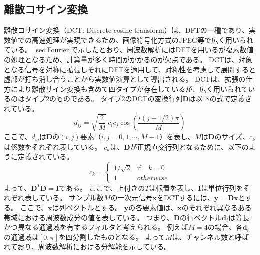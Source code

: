 \documentclass[11pt,a4paper]{jsarticle}
\begin{document}
\subsection{離散コサイン変換}\label{sec:DCT}
離散コサイン変換（DCT: Discrete cosine transform）は、DFTの一種であり、実数値での高速処理が実現できるため、画像符号化方式のJPEG等で広く用いられている。
\ref{sec:Fourier}で示したとおり、周波数解析にはDFTを用いるが複素数値の処理となるため、計算量が多く時間がかかるのが欠点である。
DCTは、対象となる信号を対称に拡張しそれにDFTを適用して、対称性を考慮して展開すると虚部が打ち消し合うことから実数値演算として導出される。
DCTは、拡張の仕方により離散サイン変換も含めて四タイプが存在しているが、広く用いられているのはタイプ$2$のものである。
タイプ$2$のDCTの変換行列$\mathbf{D}$は以下の式で定義されている。
\begin{equation}
	d_{ij}=\sqrt{\frac{2}{M}}\ 
	c_ic_j\cos\left(
	\frac{i(j+1/2)\pi}{M}
	\right)
	\label{eq:DCT}
\end{equation}
ここで、$d_{ij}$は$\mathbf{D}$の$(i,j)$要素（$i,j=0,1,\cdots,M-1$）を表し、$M$は$\mathbf{D}$のサイズ、$c_k$は係数をそれぞれ表している。
$c_k$は、$\mathbf{D}$が正規直交行列となるために、以下のように定義されている。
\begin{equation*}
	c_k=\left\{
	\begin{array}{ll}
		1/\sqrt{2}&\mathrm{if}\quad k=0\\
		1&otherwise
	\end{array}
	\right.
\end{equation*}
よって、${\mathbf D}^{T}\mathbf{D}=\mathbf{I}$である。
ここで、上付きの$T$は転置を表し、$\mathbf{I}$は単位行列をそれぞれ表している。
サンプル数$M$の一次元信号$\bm{x}$をDCTするには、$\bm{y}=\mathbf{D}\bm{x}$とする。
ここで、$\bm{x}$は列ベクトルとする。
$\bm{y}$の各要素値は、$\bm{x}$のそれぞれ異なるある帯域における周波数成分の値を表している。
つまり、$\mathbf{D}$の行ベクトル$\bm{d}_i$は等長かつ異なる通過域を有するフィルタと考えられる。
例えば$M=4$の場合、各$\bm{d}_i$の通過域は$[0,\pi]$を四分割したものとなる。
よって$M$は、チャンネル数と呼ばれており、周波数解析における分解能を示している。
\end{document}
